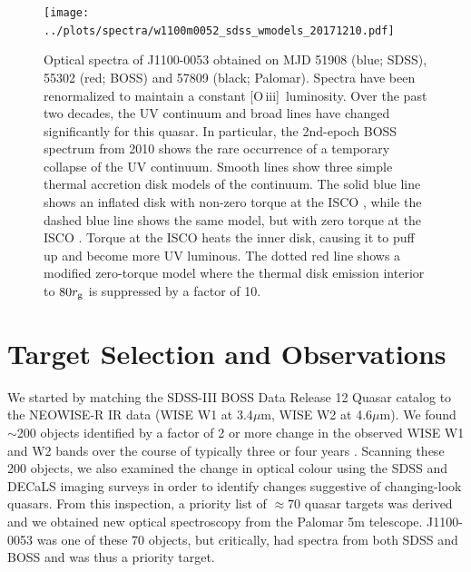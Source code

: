 \documentclass{nature}
\newcommand{\oiii}{[O\,{\sc iii}]\ }
\begin{document}
\begin{figure}
  \centering
  \texttt{[image: ../plots/spectra/w1100m0052\_sdss\_wmodels\_20171210.pdf]}
  \caption[]{Optical spectra of J1100-0053 obtained on MJD 51908 (blue; SDSS),
    55302 (red; BOSS) and 57809 (black; Palomar).  Spectra have been
    renormalized to maintain a constant \oiii luminosity.  Over the past
    two decades, the UV continuum and broad lines have changed
    significantly for this quasar.  In particular, the 2nd-epoch BOSS
    spectrum from 2010 shows the rare occurrence of a temporary collapse
    of the UV continuum.  Smooth lines show three simple thermal accretion
    disk models of the continuum.  The solid blue line shows an inflated
    disk with non-zero torque at the ISCO
    \cite[e.g.,][]{Sirko_Goodman2003}, while the dashed blue line shows
    the same model, but with zero torque at the ISCO \cite[i.e., a simple
    $\alpha$-disk model,][]{SS73}.  Torque at the ISCO heats the inner
    disk, causing it to puff up and become more UV luminous.  The dotted
    red line shows a modified zero-torque model where the thermal disk
    emission interior to $80 r_{\rm g}$ is suppressed by a factor of 10. }
  \label{fig:J110057_spectra}
\end{figure}
\section{Target Selection and Observations}  
We started by matching the SDSS-III BOSS Data Release 12 Quasar
catalog \cite[DR12Q; ][]{Paris2017} to the NEOWISE-R IR data (WISE W1
at 3.4$\mu$m, WISE W2 at 4.6$\mu$m). We found $\sim$200 objects
identified by a factor of 2 or more change in the observed WISE W1 and
W2 bands over the course of typically three or four years
\citep[see][and the Supplemental Material for the detailed NEOWISE-R
selection]{Meisner2017b}. Scanning these 200 objects, we also examined
the change in optical colour using the SDSS and DECaLS imaging surveys
in order to identify changes suggestive of changing-look quasars.
From this inspection, a priority list of $\approx70$ quasar targets
was derived and we obtained new optical spectroscopy from the Palomar
5m telescope.  J1100-0053 was one of these 70 objects, but critically,
had spectra from both SDSS and BOSS and was thus a priority target.
\end{document}
